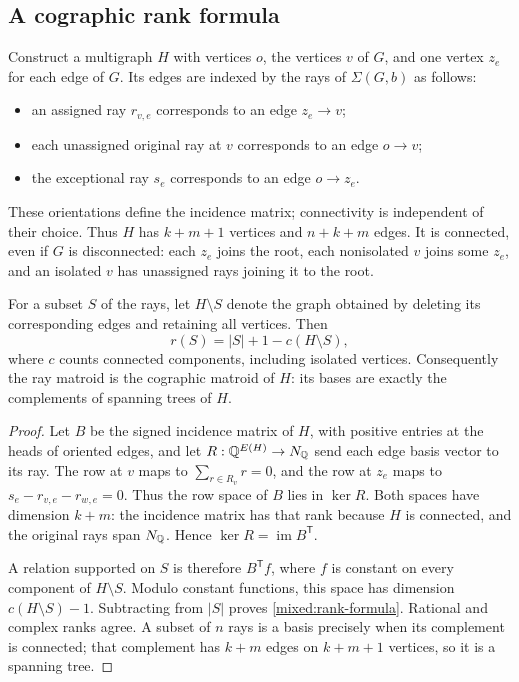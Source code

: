 \subsection{A cographic rank formula}

Construct a multigraph $H$ with vertices $o$, the vertices $v$ of $G$,
and one vertex $z_e$ for each edge of $G$. Its edges are indexed by the
rays of $\Sigma(G,b)$ as follows:
\begin{itemize}
\item an assigned ray $r_{v,e}$ corresponds to an edge $z_e\to v$;
\item each unassigned original ray at $v$ corresponds to an edge $o\to v$;
\item the exceptional ray $s_e$ corresponds to an edge $o\to z_e$.
\end{itemize}
These orientations define the incidence matrix; connectivity is
independent of their choice. Thus $H$ has $k+m+1$ vertices and $n+k+m$ edges. It is
connected, even if $G$ is disconnected: each $z_e$ joins the root, each
nonisolated $v$ joins some $z_e$, and an isolated $v$ has unassigned
rays joining it to the root.

\begin{proposition}\label{mixed:rank}
For a subset $S$ of the rays, let $H\setminus S$ denote the graph obtained
by deleting its corresponding edges and retaining all vertices. Then
\begin{equation}\label{mixed:rank-formula}
 r(S)=|S|+1-c(H\setminus S),
\end{equation}
where $c$ counts connected components, including isolated vertices.
Consequently the ray matroid is the cographic matroid of $H$: its bases
are exactly the complements of spanning trees of $H$.
\end{proposition}

\begin{proof}
Let $B$ be the signed incidence matrix of $H$, with positive entries at
the heads of oriented edges, and let $R:\mathbb{Q}^{E(H)}\to N_{\mathbb{Q}}$ send each
edge basis vector to its ray. The row at $v$ maps to
$\sum_{r\in R_v}r=0$, and the row at $z_e$ maps to
$s_e-r_{v,e}-r_{w,e}=0$. Thus the row space of $B$ lies in $\ker R$.
Both spaces have dimension $k+m$: the incidence matrix has that rank
because $H$ is connected, and the original rays span $N_{\mathbb{Q}}$. Hence
$\ker R=\operatorname{im}B^{\mathsf T}$.

A relation supported on $S$ is therefore $B^{\mathsf T}f$, where $f$
is constant on every component of $H\setminus S$. Modulo constant functions, this space has dimension
$c(H\setminus S)-1$. Subtracting from $|S|$ proves
\eqref{mixed:rank-formula}. Rational and complex ranks agree. A subset
of $n$ rays is a basis precisely when its complement is connected;
that complement has $k+m$ edges on $k+m+1$ vertices, so it is a
spanning tree.
\end{proof}

